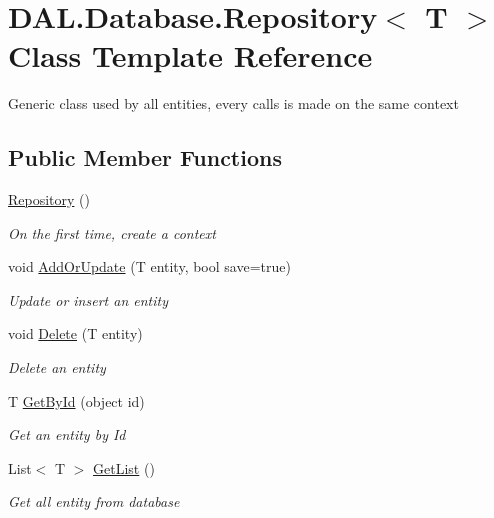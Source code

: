 \hypertarget{class_d_a_l_1_1_database_1_1_repository}{}\section{D\+A\+L.\+Database.\+Repository$<$ T $>$ Class Template Reference}
\label{class_d_a_l_1_1_database_1_1_repository}


Generic class used by all entities, every calls is made on the same context  


\subsection*{Public Member Functions}
\begin{DoxyCompactItemize}
\item 
\hyperlink{class_d_a_l_1_1_database_1_1_repository_a937df992bda81edb925ddc7ffd731f0c}{Repository} ()
\begin{DoxyCompactList}\small\item\em On the first time, create a context \end{DoxyCompactList}\item 
void \hyperlink{class_d_a_l_1_1_database_1_1_repository_a4c49f3a7978384df0e98639b935040b7}{Add\+Or\+Update} (T entity, bool save=true)
\begin{DoxyCompactList}\small\item\em Update or insert an entity \end{DoxyCompactList}\item 
void \hyperlink{class_d_a_l_1_1_database_1_1_repository_a00a8e89402d9f7f7a8035d69b2cf5e31}{Delete} (T entity)
\begin{DoxyCompactList}\small\item\em Delete an entity \end{DoxyCompactList}\item 
T \hyperlink{class_d_a_l_1_1_database_1_1_repository_abee9e993465bcb13da296143fe8b5c3e}{Get\+By\+Id} (object id)
\begin{DoxyCompactList}\small\item\em Get an entity by Id \end{DoxyCompactList}\item 
List$<$ T $>$ \hyperlink{class_d_a_l_1_1_database_1_1_repository_aad0464a6d5b228ea60b3dbb281569e21}{Get\+List} ()
\begin{DoxyCompactList}\small\item\em Get all entity from database \end{DoxyCompactList}\end{DoxyCompactItemize}
